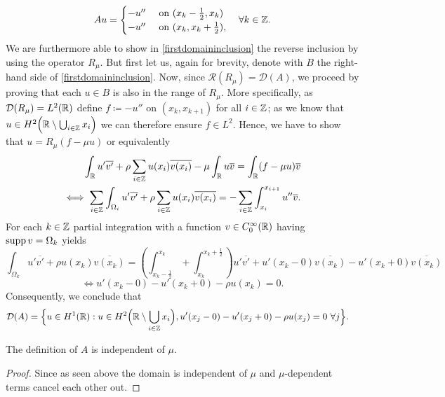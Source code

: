 	\[ A u = \begin{cases}
					- u'' & \text{ on } (x_{k} - \frac{1}{2}, x_{k}) \\
					- u'' & \text{ on } (x_{k}, x_{k} + \frac{1}{2}),
			 \end{cases} \quad \forall k \in \mathbb{Z}. \]
We are furthermore able to show in \eqref{firstdomaininclusion} the reverse inclusion by using the operator $R_{\mu}$. But first let us, again for brevity, denote with $B$ the right-hand side of \eqref{firstdomaininclusion}. Now, since $\mathcal{R}(R_{\mu}) = \mathcal{D}(A)$, we proceed by proving that each $u \in B$ is also in the range of $R_{\mu}$. More specifically, as $\mathcal{D}(R_{\mu}) = L^{2}(\mathbb{R})$ define $f \coloneqq - u''$ on $(x_{k}, x_{k + 1})$ for all $i \in \mathbb{Z}$; as we know that $u \in H^{2}\Big(\mathbb{R} \setminus \bigcup_{i \in \mathbb{Z}} x_{i} \Big)$ we can therefore ensure $f \in L^{2}$. Hence, we have to show that $u = R_{\mu}(f - \mu u)$ or equivalently 
	\begin{align*}
		 \int_{\mathbb{R}} u' \overline{v'} + \rho \sum_{i \in \mathbb{Z}} u(x_{i}) \overline{v(x_{i})} - \mu \int_{\mathbb{R}} u \overline{v}= \int_{\mathbb{R}}(f-\mu u) \overline{v} \\
		\iff \sum_{i \in \mathbb{Z}} \int_{\Omega_{i}} u' \overline{v'} + \rho \sum_{i \in \mathbb{Z}} u(x_{i}) \overline{v(x_{i})} = - \sum_{i \in \mathbb{Z}} \int_{x_{i}}^{x_{i+1}} u'' \overline{v}.
	\end{align*}
For each $k \in \mathbb{Z}$ partial integration with a function $v \in C_{0}^{\infty}(\mathbb{R})$ having $\operatorname{supp} v = \Omega_{k}$ yields
	\[ \int_{\Omega_{k}} u' \overline{v'} + \rho u(x_{k}) \overline{v(x_{k})} =\left( \int_{x_{k} - \frac{1}{2}}^{x_{k}} + \int_{x_{k}}^{x_{k} +\frac{1}{2}} \right) u' \overline{v'} + u'(x_{k}-0) \overline{v(x_{k})}  - u'(x_{k}+0) \overline{v(x_{k})}  \]
	\[ \iff u'(x_{k}-0) - u'(x_{k}+0) - \rho u(x_{k}) = 0. \]
Consequently, we conclude that
	\begin{align*}
		\mathcal{D}(A) & = \Big\{ u \in H^{1}(\mathbb{R}): u \in H^{2}\Big(\mathbb{R} \setminus \bigcup_{i \in \mathbb{Z}} x_{i} \Big), u'(x_{j} - 0) - u'(x_{j} + 0) - \rho u(x_{j}) = 0 ~\forall j \Big\}.
	\end{align*}
\begin{remark}
	The definition of $A$ is independent of $\mu$.
\end{remark}

\begin{proof} %
	 Since as seen above the domain is independent of $\mu$ and $\mu$-dependent terms cancel each other out.
\end{proof}

